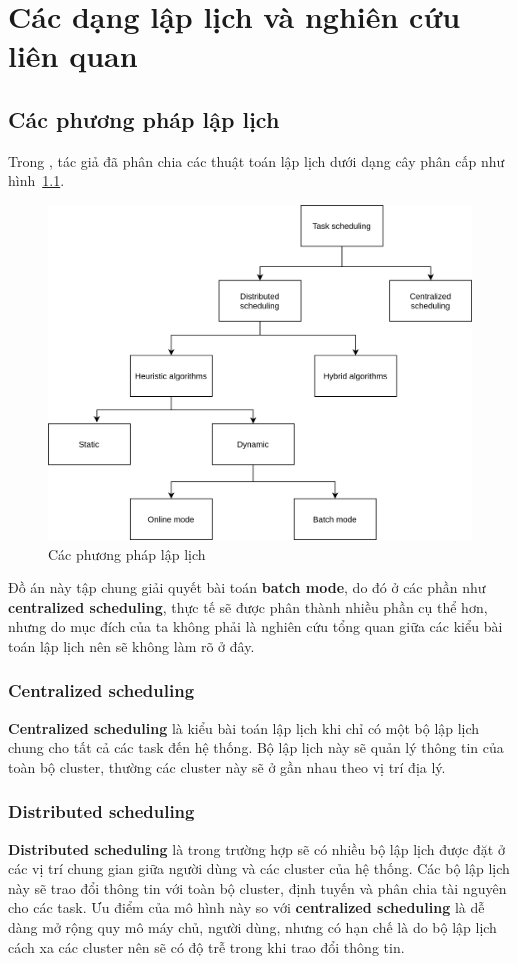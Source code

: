 \documentclass{my_style}
\begin{document}
\newpage
\chapter{Các dạng lập lịch và nghiên cứu liên quan}
\label{related_works}
\section{Các phương pháp lập lịch}
Trong \cite{8}, tác giả đã phân chia các thuật toán lập lịch dưới dạng cây phân cấp như hình~\ref{fig:3}.
\begin{figure}[h!]
	\centering
	\includegraphics[scale=0.6]{images/scheduling_classification.png}
	\caption{Các phương pháp lập lịch}
	\label{fig:3}
\end{figure}
Đồ án này tập chung giải quyết bài toán \textbf{batch mode}, do đó ở các phần như \textbf{centralized scheduling}, thực tế sẽ được phân thành nhiều phần cụ thể hơn, nhưng do mục đích của ta không phải là nghiên cứu tổng quan giữa các kiểu bài toán lập lịch nên sẽ không làm rõ ở đây. 

\subsection{Centralized scheduling}
\textbf{Centralized scheduling}\cite{9} là kiểu bài toán lập lịch khi chỉ có một bộ lập lịch chung cho tất cả các task đến hệ thống. Bộ lập lịch này sẽ quản lý thông tin của toàn bộ cluster, thường các cluster này sẽ ở gần nhau theo vị trí địa lý. 

\subsection{Distributed scheduling}
\textbf{Distributed scheduling}\cite{9} là trong trường hợp sẽ có nhiều bộ lập lịch được đặt ở các vị trí chung gian giữa người dùng và các cluster của hệ thống. Các bộ lập lịch này sẽ trao đổi thông tin với toàn bộ cluster, định tuyến và phân chia tài nguyên cho các task. Ưu điểm của mô hình này so với \textbf{centralized scheduling} là dễ dàng mở rộng quy mô máy chủ, người dùng, nhưng có hạn chế là do bộ lập lịch cách xa các cluster nên sẽ có độ trễ trong khi trao đổi thông tin. 
\end{document}
